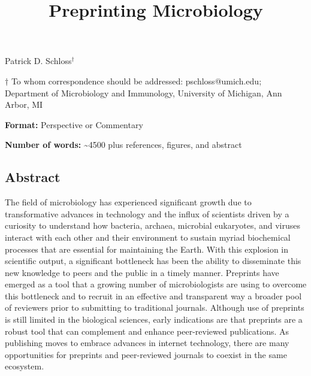 \documentclass[11pt,]{article}
\title{\textbf{Preprinting Microbiology}}
\author{}
\date{}
\begin{document}
\maketitle

\begin{center}
\vspace{25mm}
Patrick D. Schloss${^\dagger}$

\vspace{30mm}

$\dagger$ To whom correspondence should be addressed: pschloss@umich.edu; Department of Microbiology and Immunology, University of Michigan, Ann Arbor, MI

\vspace{10mm}

\textbf{Format:} Perspective or Commentary

\textbf{Number of words:} \textasciitilde4500 plus references, figures, and abstract

\end{center}

\newpage

\linenumbers

\subsection{Abstract}\label{abstract}

The field of microbiology has experienced significant growth due to
transformative advances in technology and the influx of scientists
driven by a curiosity to understand how bacteria, archaea, microbial
eukaryotes, and viruses interact with each other and their environment
to sustain myriad biochemical processes that are essential for
maintaining the Earth. With this explosion in scientific output, a
significant bottleneck has been the ability to disseminate this new
knowledge to peers and the public in a timely manner. Preprints have
emerged as a tool that a growing number of microbiologists are using to
overcome this bottleneck and to recruit in an effective and transparent
way a broader pool of reviewers prior to submitting to traditional
journals. Although use of preprints is still limited in the biological
sciences, early indications are that preprints are a robust tool that
can complement and enhance peer-reviewed publications. As publishing
moves to embrace advances in internet technology, there are many
opportunities for preprints and peer-reviewed journals to coexist in the
same ecosystem.

\newpage
\end{document}
